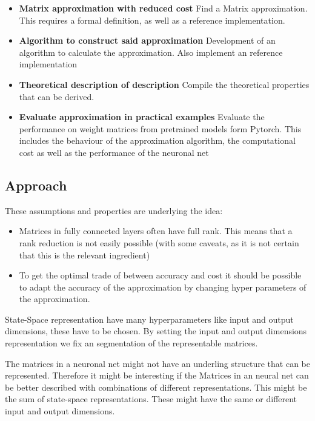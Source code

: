 \documentclass[lang=ngerman,inputenc=utf8,fontsize=10pt]{ldvarticle}
\begin{document}
\begin{itemize}

	\item\textbf{Matrix approximation with reduced cost} Find a Matrix approximation. This requires a formal definition, as well as a reference implementation.
	\item\textbf{Algorithm to construct said approximation} Development of an algorithm to calculate the approximation. Also implement an reference implementation
	\item\textbf{Theoretical description of description} Compile the theoretical properties that can be derived.
	\item\textbf{Evaluate approximation in practical examples} Evaluate the performance on weight matrices from pretrained models form Pytorch. This includes the behaviour of the approximation algorithm, the computational cost as well as the performance of the neuronal net
\end{itemize}





\subsection*{Approach}

These assumptions and properties are underlying the idea:
\begin{itemize}
	\item Matrices in fully connected layers often have full rank. This means that a rank reduction is not easily possible (with some caveats, as it is not certain that this is the relevant ingredient) \cite{martin_implicit_2018}
	\item To get the optimal trade of between accuracy and cost it should be possible to adapt the accuracy of the approximation by changing hyper parameters of the approximation.
\end{itemize}

State-Space representation have many hyperparameters like input and output dimensions, these have to be chosen. By setting the input and output dimensions representation we fix an segmentation of the representable matrices.

The matrices in a neuronal net might not have an underling structure that can be represented.
Therefore it might be interesting if the Matrices in an neural net can be better described with combinations of different representations.
This might be the sum of state-space representations. These might have the same or different input and output dimensions.
\end{document}

